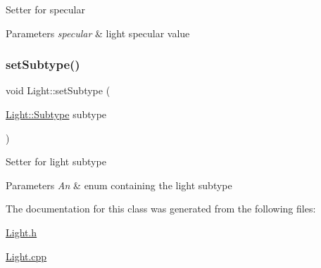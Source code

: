 Setter for specular 
\begin{DoxyParams}{Parameters}
{\em specular} & light specular value \\
\hline
\end{DoxyParams}
\mbox{\label{classLight_a853de52827212e0a3940b24b3474b397}} 
\subsubsection{\texorpdfstring{set\+Subtype()}{setSubtype()}}
{\footnotesize\ttfamily void Light\+::set\+Subtype (\begin{DoxyParamCaption}\item[{\hyperlink{classLight_a7b5feeb01dd53961e0e523f3d2f5fa7f}{Light\+::\+Subtype}}]{subtype }\end{DoxyParamCaption})}

Setter for light subtype 
\begin{DoxyParams}{Parameters}
{\em An} & enum containing the light subtype \\
\hline
\end{DoxyParams}


The documentation for this class was generated from the following files\+:\begin{DoxyCompactItemize}
\item 
\hyperlink{Light_8h}{Light.\+h}\item 
\hyperlink{Light_8cpp}{Light.\+cpp}\end{DoxyCompactItemize}
